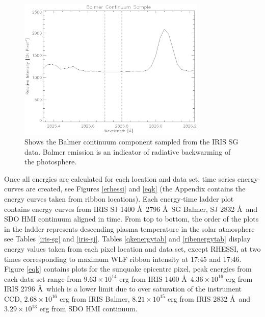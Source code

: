 \begin{figure}[H]
  \begin{center}
  \includegraphics[width=0.8\textwidth]{29-Mar-14-Balmer-Continuum}
  \end{center}
  \caption{Shows the Balmer continuum component sampled from the IRIS SG data. Balmer emission is an indicator of radiative backwarming of the photosphere. }\label{balmercontinuum}
\end{figure}


Once all energies are calculated for each location and data set, time series energy-curves are created, see Figures \ref{erhessi} and \ref{eqk} (the Appendix contains the energy curves taken from ribbon locations). Each energy-time ladder plot contains energy curves from IRIS SJ 1400 \AA\, 2796 \AA\, SG Balmer, SJ 2832 \AA\ and SDO HMI continuum aligned in time. From top to bottom, the order of the plots in the ladder represents descending plasma temperature in the solar atmosphere see Tables \ref{iris-sg} and \ref{iris-sj}. Tables \ref{qkenergytab} and \ref{ribenergytab} display energy values taken from each pixel location and data set, except RHESSI, at two times corresponding to maximum WLF ribbon intensity at 17:45 and 17:46. Figure \ref{eqk} contains plots for the sunquake epicentre pixel, peak energies from each data set range from $9.63{\times}10^{14}$ erg from IRIS 1400 \AA\, $4.36{\times}10^{16}$ erg from IRIS 2796 \AA\ which is a lower limit due to over saturation of the instrument CCD, $2.68{\times}10^{16}$ erg from IRIS Balmer, $8.21{\times}10^{15}$ erg from IRIS 2832 \AA\ and $3.29{\times}10^{13}$ erg from SDO HMI continuum. 

